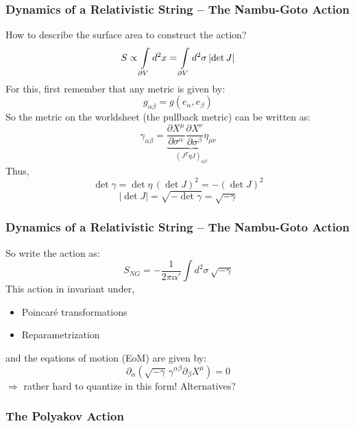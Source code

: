 \documentclass[aspectratio=169]{beamer}
\begin{document}
	\begin{frame}
		\frametitle{Dynamics of a Relativistic String -- The Nambu-Goto Action}
		How to describe the surface area to construct the action?
		\begin{equation*}
			S \propto \int\displaylimits_{\partial V} d^2x = \int\displaylimits_{\partial V}d^2\sigma \left| \det J \right|
		\end{equation*}
		For this, first remember that any metric is given by:
		\begin{equation*}
			g_{\alpha\beta} = g(e_\alpha,e_\beta)
		\end{equation*}
		\color{black}
		So the metric on the worldsheet (the pullback metric) can be written as:
		\begin{equation*}
			\gamma_{\alpha\beta} = \underbrace{\frac{\partial X^\mu}{\partial\sigma^\alpha} \frac{\partial X^\nu}{\partial\sigma^\beta} \eta_{\mu\nu}}_{(J^T \eta J)_{\alpha\beta}}
		\end{equation*}
		Thus,
		\begin{equation*}
			\det \gamma = \det\eta \, (\det J)^2 = - (\det J)^2
		\end{equation*}
		\begin{equation*}
			\left| \det J \right| = \sqrt{-\det\gamma} = \sqrt{-\gamma}
		\end{equation*}
	\end{frame}

	\begin{frame}
		\frametitle{Dynamics of a Relativistic String -- The Nambu-Goto Action}
		So write the action as:
		\begin{equation*}
			S_{NG} = -\frac{1}{2\pi\alpha'} \int d^2\sigma \, \sqrt{-\gamma}
		\end{equation*}
		This action in invariant under,
		\begin{itemize}
			\item Poincaré transformations
			\item Reparametrization
		\end{itemize}
		and the eqations of motion (EoM) are given by:
		\begin{equation*}
			\partial_\alpha\left(\sqrt{-\gamma}\,\gamma^{\alpha\beta}\partial_\beta X^\mu\right) = 0
		\end{equation*}
		$\Rightarrow$ rather hard to quantize in this form! Alternatives?
	\end{frame}

	\subsubsection{The Polyakov Action}
\end{document}
